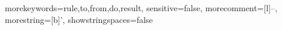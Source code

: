 {morekeywords={rule,to,from,do,result},
sensitive=false,
morecomment=[l]{--},
morestring=[b]',
showstringspaces=false
}